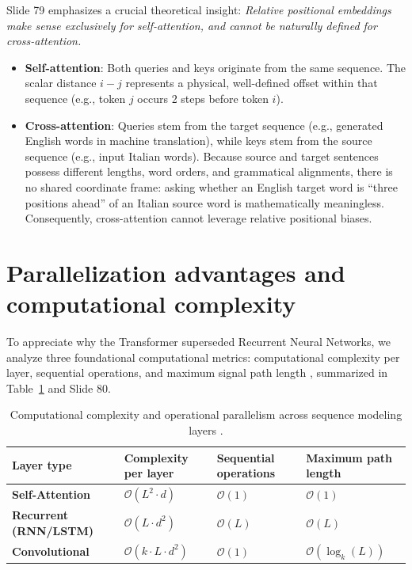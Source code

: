\documentclass[../../main.tex]{subfiles}
\begin{document}
\begin{examinsight}
Slide 79 emphasizes a crucial theoretical insight: \emph{Relative positional embeddings make sense exclusively for self-attention, and cannot be naturally defined for cross-attention.}
\begin{itemize}
    \item \textbf{Self-attention}: Both queries and keys originate from the same sequence. The scalar distance $i - j$ represents a physical, well-defined offset within that sequence (e.g., token $j$ occurs 2 steps before token $i$).
    \item \textbf{Cross-attention}: Queries stem from the target sequence (e.g., generated English words in machine translation), while keys stem from the source sequence (e.g., input Italian words). Because source and target sentences possess different lengths, word orders, and grammatical alignments, there is no shared coordinate frame: asking whether an English target word is ``three positions ahead'' of an Italian source word is mathematically meaningless. Consequently, cross-attention cannot leverage relative positional biases.
\end{itemize}
\end{examinsight}

\section{Parallelization advantages and computational complexity}
\label{sec:computational_complexity}

To appreciate why the Transformer superseded Recurrent Neural Networks, we analyze three foundational computational metrics: computational complexity per layer, sequential operations, and maximum signal path length \cite{vaswani2017}, summarized in Table~\ref{tab:layer_complexity_comparison} and Slide 80.

\begin{table}[htbp]
\centering
\small
\caption{Computational complexity and operational parallelism across sequence modeling layers \cite{vaswani2017}.}
\label{tab:layer_complexity_comparison}
\begin{tabularx}{\textwidth}{lXXX}
\toprule
\textbf{Layer type} & \textbf{Complexity per layer} & \textbf{Sequential operations} & \textbf{Maximum path length} \\
\midrule
\textbf{Self-Attention} & $\mathcal{O}(L^2 \cdot d)$ & $\mathcal{O}(1)$ & $\mathcal{O}(1)$ \\
\textbf{Recurrent (RNN/LSTM)} & $\mathcal{O}(L \cdot d^2)$ & $\mathcal{O}(L)$ & $\mathcal{O}(L)$ \\
\textbf{Convolutional} & $\mathcal{O}(k \cdot L \cdot d^2)$ & $\mathcal{O}(1)$ & $\mathcal{O}(\log_k(L))$ \\
\bottomrule
\end{tabularx}
\end{table}
\end{document}
